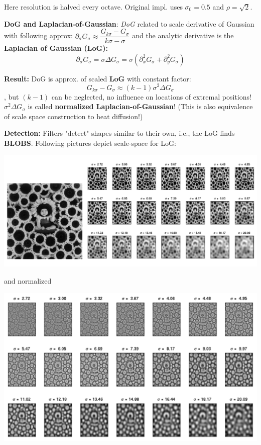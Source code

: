Here resolution is halved every octave. Original impl. uses $\sigma_0 = 0.5$ and $\rho = \sqrt{2}$.

\textbf{DoG and Laplacian-of-Gaussian}: \textit{DoG} related to scale derivative of Gaussian with following approx: $\partial_\sigma G_\sigma \approx \dfrac{G_{k\sigma} - G_\sigma}{k\sigma - \sigma}$ and the analytic derivative is the \textbf{Laplacian of Gaussian (LoG):} $$\partial_\sigma G_\sigma = \sigma \Delta G_\sigma = \sigma(\partial^2_x G_\sigma + \partial^2_y G_\sigma)$$

\textbf{Result:} DoG is approx. of scaled \textbf{LoG} with constant factor: $$G_{k\sigma} - G_\sigma \approx (k-1)\sigma^2 \Delta G_\sigma$$, but $(k-1)$ can be neglected, no influence on locations of extremal positions! $\sigma^2 \Delta G_\sigma$ is called \textbf{normalized Laplacian-of-Gaussian}! (This is also equivalence of scale space construction to heat diffusion!)

\textbf{Detection:} Filters "detect" shapes similar to their own, i.e., the LoG finds \textbf{BLOBS}. Following pictures depict scale-space for LoG:

\includegraphics[width=\textwidth]{images/chap5/LOG}

and normalized

\includegraphics[width=\textwidth]{images/chap5/LOG_norm}

